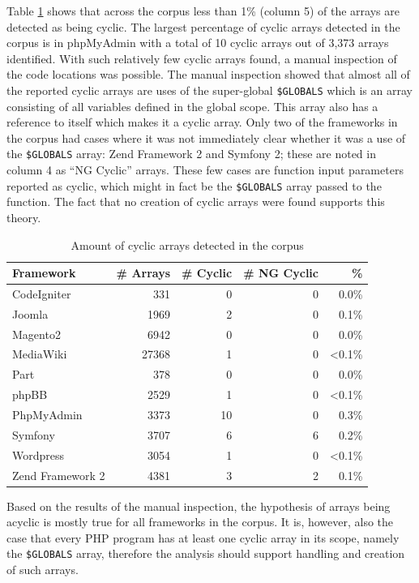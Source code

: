 

Table \ref{tab:cyclic_arrays} shows that across the corpus less than 1\% (column 5) of the arrays are detected as being cyclic. The largest percentage of cyclic arrays detected in the corpus is in phpMyAdmin with a total of 10 cyclic arrays out of 3,373 arrays identified. With such relatively few cyclic arrays found, a manual inspection of the code locations was possible. The manual inspection showed that almost all of the reported cyclic arrays are uses of the super-global \texttt{\$GLOBALS} which is an array consisting of all variables defined in the global scope. This array also has a reference to itself which makes it a cyclic array. Only two of the frameworks in the corpus had cases where it was not immediately clear whether it was a use of the \texttt{\$GLOBALS} array: Zend Framework 2 and Symfony 2; these are noted in column 4 as ``NG Cyclic'' arrays. These few cases are function input parameters reported as cyclic, which might in fact be the \texttt{\$GLOBALS} array passed to the function. The fact that no creation of cyclic arrays were found supports this theory.

\begin{table}
\centering

\begin{tabular}{l| r  r  r  r}
Framework & \# Arrays & \# Cyclic & \# NG Cyclic & \%  \\ \hline \hline
CodeIgniter & 331 & 0 & 0 & 0.0\% \\
Joomla & 1969 & 2 & 0 & 0.1\% \\ 
Magento2 & 6942 & 0 & 0 & 0.0\%\\ 
MediaWiki & 27368 & 1 & 0 & <0.1\%\\ 
Part & 378 & 0 & 0 & 0.0\%\\ 
phpBB & 2529 & 1 & 0 & <0.1\%\\
PhpMyAdmin & 3373 & 10 & 0 & 0.3\%\\
Symfony & 3707 & 6 & 6 & 0.2\%\\ %
Wordpress & 3054 & 1 & 0 & <0.1\%\\ 
Zend Framework 2 & 4381 & 3 & 2 & 0.1\%
\end{tabular}

\caption{Amount of cyclic arrays detected in the corpus}
\label{tab:cyclic_arrays}
\end{table}

Based on the results of the manual inspection, the hypothesis of arrays being acyclic is mostly true for all frameworks in the corpus. It is, however, also the case that every PHP program has at least one cyclic array in its scope, namely the \texttt{\$GLOBALS} array, therefore the analysis should support handling and creation of such arrays.

